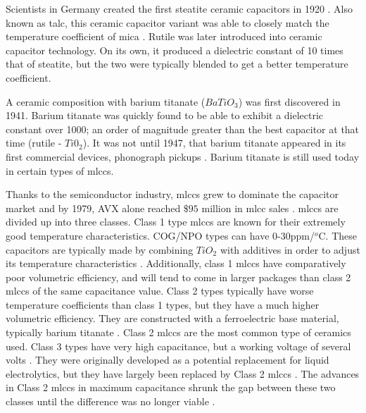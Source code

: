 Scientists in Germany created the first steatite ceramic capacitors in 1920 \cite[Ch 3 Sec II]{cerMaterials}\cite{cerDie}. Also known as talc, this ceramic capacitor variant was able to closely match the temperature coefficient of mica \cite{steatite_hf}. Rutile was later introduced into ceramic capacitor technology. On its own, it produced a dielectric constant of 10 times that of steatite, but the two were typically blended to get a better temperature coefficient.

A ceramic composition with barium titanate ($BaTiO_3$) was first discovered in 1941. Barium titanate was quickly found to be able to exhibit a dielectric constant over 1000; an order of magnitude greater than the best capacitor at that time (rutile - $Ti0_2$). It was not until 1947, that barium titanate appeared in its first commercial devices, phonograph pickups \cite{piezCer}\cite{hist_cerFilt}\cite[Ch 3 Sec III]{cerMaterials}. Barium titanate is still used today in certain types of \glspl{mlcc}.

Thanks to the semiconductor industry, \glspl{mlcc} grew to dominate the capacitor market and by 1979, AVX alone reached $\$95$ million in \gls{mlcc} sales \cite{avx_hist}.
\glspl{mlcc} are divided up into three classes. Class 1 type \glspl{mlcc} are known for their extremely good temperature characteristics. COG/NPO types can have 0-30ppm/$^o$C. These capacitors are typically made by combining $TiO_2$ with additives in order to adjust its temperature characteristics \cite{intro_cerCaps}. Additionally, class 1 \glspl{mlcc} have comparatively poor volumetric efficiency, and will tend to come in larger packages than class 2 \glspl{mlcc} of the same capacitance value. Class 2 types typically have worse temperature coefficients than class 1 types, but they have a much higher volumetric efficiency. They are constructed with a ferroelectric base material, typically barium titanate \cite{intro_cerCaps}. Class 2 \glspl{mlcc} are the most common type of ceramics used. Class 3 types have very high capacitance, but a working voltage of several volts \cite{hist_cerFilt}\cite[Ch 3 Sec VI]{cerMaterials}\cite{atCer_tempco}. They were originally developed as a potential replacement for liquid electrolytics, but they have largely been replaced by Class 2 \glspl{mlcc} \cite{wiki_cer}. The advances in Class 2 \glspl{mlcc} in maximum capacitance shrunk the gap between these two classes until the difference was no longer viable \cite{wiki_cer}.

